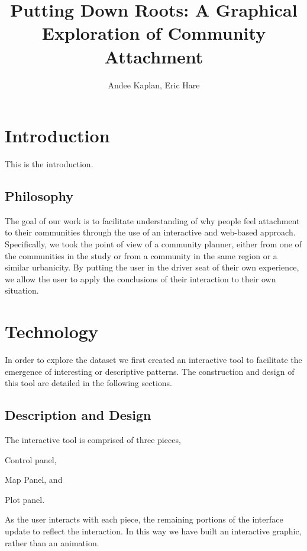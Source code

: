 \documentclass[11pt]{article}\usepackage{knitr}
\begin{document}
\setlength{\parskip}{3ex}
\setlength{\parindent}{0pt}

\title{Putting Down Roots: A Graphical Exploration of Community Attachment}
\author{Andee Kaplan, Eric Hare}

\maketitle

\setcounter{page}{1}
\section*{Introduction}

This is the introduction.

\subsection*{Philosophy}
The goal of our work is to facilitate understanding of why people feel attachment to their communities through the use of an interactive and web-based approach. Specifically, we took the point of view of a community planner, either from one of the communities in the study or from a community in the same region or a similar urbanicity. By putting the user in the driver seat of their own experience, we allow the user to apply the conclusions of their interaction to their own situation.


\section*{Technology}

In order to explore the dataset we first created an interactive tool to facilitate the emergence of interesting or descriptive patterns. The construction and design of this tool are detailed in the following sections.

\subsection*{Description and Design}
The interactive tool is comprised of three pieces, \begin{inparaenum}[\itshape 1\upshape)]
\item Control panel, 
\item Map Panel, and
\item Plot panel.
\end{inparaenum}
As the user interacts with each piece, the remaining portions of the interface update to reflect the interaction. In this way we have built an interactive graphic, rather than an animation.
\end{document}
